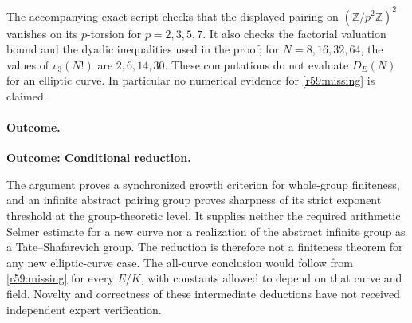 \documentclass[11pt,a4paper]{article}
\newcommand{\Z}{\mathbb{Z}}
\numberwithin{equation}{section}
\begin{document}
The accompanying exact script checks that the displayed pairing on $(\Z/p^2\Z)^2$ vanishes on its $p$-torsion for $p=2,3,5,7$. It also checks the factorial valuation bound and the dyadic inequalities used in the proof; for $N=8,16,32,64$, the values of $v_3(N!)$ are $2,6,14,30$. These computations do not evaluate $D_E(N)$ for an elliptic curve. In particular no numerical evidence for \eqref{r59:missing} is claimed.

\paragraph{Outcome.}
\textbf{Outcome: Conditional reduction.}

The argument proves a synchronized growth criterion for whole-group finiteness, and an infinite abstract pairing group proves sharpness of its strict exponent threshold at the group-theoretic level. It supplies neither the required arithmetic Selmer estimate for a new curve nor a realization of the abstract infinite group as a Tate--Shafarevich group. The reduction is therefore not a finiteness theorem for any new elliptic-curve case. The all-curve conclusion would follow from \eqref{r59:missing} for every $E/K$, with constants allowed to depend on that curve and field. Novelty and correctness of these intermediate deductions have not received independent expert verification.
\end{document}
